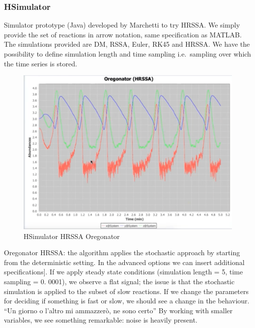 \subsubsection{HSimulator}
Simulator prototype (Java) developed by Marchetti to try HRSSA.
We simply provide the set of reactions in arrow notation, same specification as MATLAB.
The simulations provided are DM, RSSA, Euler, RK45 and HRSSA.
We have the possibility to define simulation length and time sampling i.e.~sampling over which the time series is stored.

\begin{figure}
  \centering
  \includegraphics{HRSSA_oregonator.png}
  \caption{HSimulator HRSSA Oregonator}
\end{figure}

Oregonator HRSSA: the algorithm applies the stochastic approach by starting from the deterministic setting.
In the advanced options we can insert additional specifications{]}.
If we apply steady state conditions (simulation length = 5, time sampling = 0.
0001), we observe a flat signal; the issue is that the stochastic simulation is applied to the subset of slow reactions.
If we change the parameters for deciding if something is fast or slow, we should see a change in the behaviour.
``Un giorno o l'altro mi ammazzerò, ne sono certo'' By working with smaller variables, we see something remarkable: noise is heavily present.
